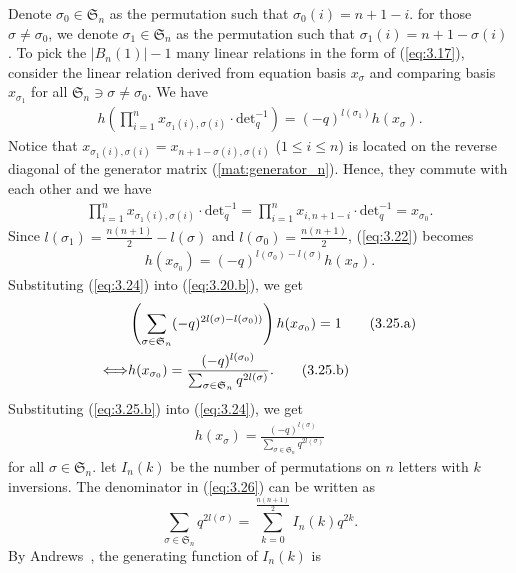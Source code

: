 \documentclass[table,a4paper,reqno]{amsart}
\numberwithin{equation}{section}
\theoremstyle{definition}
\begin{document}
Denote $\sigma_0\in\mathfrak{S}_n$ as the permutation such that $\sigma_0(i)=n+1-i$. for those $\sigma\ne\sigma_0$, we denote $\sigma_1\in\mathfrak{S}_n$ as the permutation such that $\sigma_1(i)=n+1-\sigma(i)$. To pick the $|B_n(1)|-1$ many linear relations in the form of (\ref{eq:3.17}), consider the linear relation  derived from equation basis $x_\sigma$ and comparing basis $x_{\sigma_1}$ for all $\mathfrak{S}_n\ni\sigma\ne\sigma_0$. We have
\begin{align}\label{eq:3.22}
    h\left(\prod_{i=1}^nx_{\sigma_1(i),\sigma(i)}\cdot\text{det}_q^{-1}\right)=(-q)^{l(\sigma_1)}h(x_\sigma).
\end{align}
Notice that $x_{\sigma_1(i),\sigma(i)}=x_{n+1-\sigma(i),\sigma(i)}$ ($1\le i\le n$) is located on the reverse diagonal of the generator matrix (\ref{mat:generator_n}). Hence, they commute with each other and we have
\begin{align}\label{eq:3.23}
    \prod_{i=1}^nx_{\sigma_1(i),\sigma(i)}\cdot\text{det}_q^{-1}=\prod_{i=1}^nx_{i,n+1-i}\cdot\text{det}_q^{-1}=x_{\sigma_0}.
\end{align}
Since $l(\sigma_1)=\frac{n(n+1)}{2}-l(\sigma)$ and $l(\sigma_0)=\frac{n(n+1)}{2}$, (\ref{eq:3.22}) becomes
\begin{align}\label{eq:3.24}
    h(x_{\sigma_0})=(-q)^{l(\sigma_0)-l(\sigma)}h(x_{\sigma}).
\end{align}
Substituting (\ref{eq:3.24}) into (\ref{eq:3.20.b}), we get
\begin{align}\stepcounter{equation}
    &\left(\sum_{\sigma\in\mathfrak{S}_n}(-q)^{2l(\sigma)-l(\sigma_0))}\right)h(x_{\sigma_0})=1\tag{3.25.a}\label{eq:3.25.a}\\
    \Longleftrightarrow&h(x_{\sigma_0})=\frac{(-q)^{l(\sigma_0)}}{\sum_{\sigma\in\mathfrak{S}_n}q^{2l(\sigma)}}.\tag{3.25.b}\label{eq:3.25.b}
\end{align}
Substituting (\ref{eq:3.25.b}) into (\ref{eq:3.24}), we get
\begin{align}\label{eq:3.26}
    h(x_{\sigma})=\frac{(-q)^{l(\sigma)}}{\sum_{\sigma\in\mathfrak{S}_n}q^{2l(\sigma)}}
\end{align}
for all $\sigma\in\mathfrak{S}_n$. let $I_n(k)$ be the number of permutations on $n$ letters with $k$ inversions. The denominator in (\ref{eq:3.26}) can be written as
\begin{equation}
    \sum_{\sigma\in\mathfrak{S}_n}q^{2l(\sigma)}=\sum_{k=0}^{\frac{n(n+1)}{2}}I_n(k)q^{2k}.
\end{equation}
By Andrews~\cite{andrews1998theory}, the generating function of $I_n(k)$ is
\end{document}

